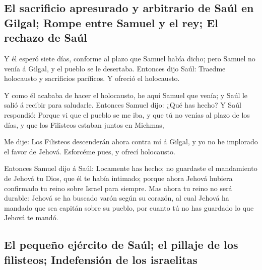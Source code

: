 \hypertarget{el-sacrificio-apresurado-y-arbitrario-de-sauxfal-en-gilgal-rompe-entre-samuel-y-el-rey-el-rechazo-de-sauxfal}{%
\subsection{El sacrificio apresurado y arbitrario de Saúl en Gilgal;
Rompe entre Samuel y el rey; El rechazo de
Saúl}\label{el-sacrificio-apresurado-y-arbitrario-de-sauxfal-en-gilgal-rompe-entre-samuel-y-el-rey-el-rechazo-de-sauxfal}}

 Y él esperó siete días, conforme al plazo que Samuel
había dicho; pero Samuel no venía á Gilgal, y el pueblo se le desertaba.
 Entonces dijo Saúl: Traedme holocausto y sacrificios
pacíficos. Y ofreció el holocausto.

 Y como él acababa de hacer el holocausto, he aquí Samuel
que venía; y Saúl le salió á recibir para saludarle. 
Entonces Samuel dijo: ¿Qué has hecho? Y Saúl respondió: Porque vi que el
pueblo se me iba, y que tú no venías al plazo de los días, y que los
Filisteos estaban juntos en Michmas,

 Me dije: Los Filisteos descenderán ahora contra mí á
Gilgal, y yo no he implorado el favor de Jehová. Esforcéme pues, y
ofrecí holocausto.

 Entonces Samuel dijo á Saúl: Locamente has hecho; no
guardaste el mandamiento de Jehová tu Dios, que él te había intimado;
porque ahora Jehová hubiera confirmado tu reino sobre Israel para
siempre.  Mas ahora tu reino no será durable: Jehová se
ha buscado varón según su corazón, al cual Jehová ha mandado que sea
capitán sobre su pueblo, por cuanto tú no has guardado lo que Jehová te
mandó.

\hypertarget{el-pequeuxf1o-ejuxe9rcito-de-sauxfal-el-pillaje-de-los-filisteos-indefensiuxf3n-de-los-israelitas}{%
\subsection{El pequeño ejército de Saúl; el pillaje de los filisteos;
Indefensión de los
israelitas}\label{el-pequeuxf1o-ejuxe9rcito-de-sauxfal-el-pillaje-de-los-filisteos-indefensiuxf3n-de-los-israelitas}}

